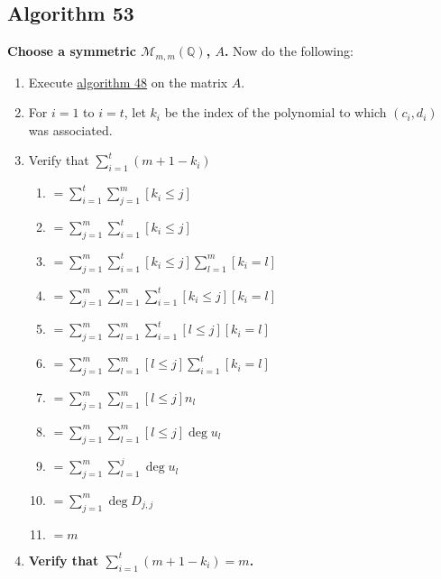 \documentclass[twocolumn]{article}
\begin{document}
		\subsection{Algorithm 53}\label{sec:algorithm 53}
			\textbf{Choose a symmetric $\mathcal{M}_{m,m}(\mathbb{Q})$, $A$.} Now do the following:
			\begin{enumerate}
				\item Execute \hyperref[sec:algorithm 48]{algorithm 48} on the matrix $A$.
				\item For $i=1$ to $i=t$, let $k_i$ be the index of the polynomial to which $(c_i, d_i)$ was associated.
				\item Verify that $\sum_{i=1}^t(m+1-k_i)$
				\begin{enumerate}
					\item $=\sum_{i=1}^t\sum_{j=1}^m [k_i\le j]$
					\item $=\sum_{j=1}^m\sum_{i=1}^t [k_i\le j]$
					\item $=\sum_{j=1}^m\sum_{i=1}^t [k_i\le j]\sum_{l=1}^m [k_i=l]$
					\item $=\sum_{j=1}^m\sum_{l=1}^m\sum_{i=1}^t [k_i\le j][k_i=l]$
					\item $=\sum_{j=1}^m\sum_{l=1}^m\sum_{i=1}^t [l\le j][k_i=l]$
					\item $=\sum_{j=1}^m\sum_{l=1}^m [l\le j]\sum_{i=1}^t [k_i=l]$
					\item $=\sum_{j=1}^m\sum_{l=1}^m [l\le j]n_l$
					\item $=\sum_{j=1}^m\sum_{l=1}^m [l\le j]\deg u_l$
					\item $=\sum_{j=1}^m\sum_{l=1}^j \deg u_l$
					\item $=\sum_{j=1}^m \deg D_{j,j}$
					\item $=m$
				\end{enumerate}
				\item \textbf{Verify that $\sum_{i=1}^t(m+1-k_i)=m$.}
			\end{enumerate}
\end{document}
